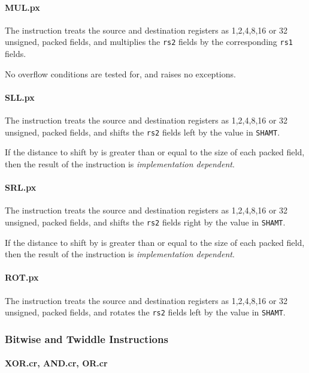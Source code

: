 \paragraph{MUL.px}

The instruction  treats the source and destination registers as
1,2,4,8,16 or 32 unsigned, packed fields, and multiplies the {\tt rs2} fields
by the corresponding {\tt rs1} fields.

No overflow conditions are tested for, and  raises no exceptions.

\paragraph{SLL.px}

The instruction  treats the source and destination registers as
1,2,4,8,16 or 32 unsigned, packed fields, and shifts the {\tt rs2} fields
left by the value in {\tt SHAMT}.

If the distance to shift by is greater than or equal to the size of each
packed field, then the result of the  instruction is
{\em implementation dependent}.

\paragraph{SRL.px}

The instruction  treats the source and destination registers as
1,2,4,8,16 or 32 unsigned, packed fields, and shifts the {\tt rs2} fields
right by the value in {\tt SHAMT}.

If the distance to shift by is greater than or equal to the size of each
packed field, then the result of the  instruction is
{\em implementation dependent}.

\paragraph{ROT.px}

The instruction  treats the source and destination registers as
1,2,4,8,16 or 32 unsigned, packed fields, and rotates the {\tt rs2} fields
left by the value in {\tt SHAMT}.

\subsubsection{Bitwise and Twiddle Instructions}

\paragraph{XOR.cr, AND.cr, OR.cr}

